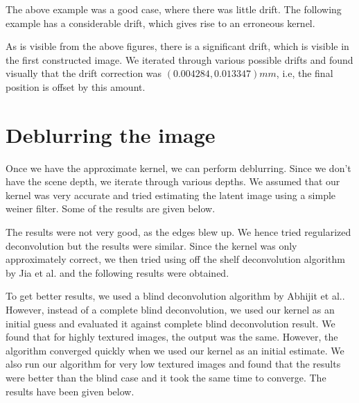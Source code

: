 \documentclass[BTech]{iitmdiss}
\begin{document}
The above example was a good case, where there was little drift. The 
following example has a considerable drift, which gives rise to an 
erroneous kernel.

As is visible from the above figures, there is a significant drift, which
is visible in the first constructed image. We iterated through various
possible drifts and found visually that the drift correction was
$(0.004284, 0.013347)mm$, i.e, the final position is offset by this 
amount. 

\section{Deblurring the image}
\label{deblurring:deblurring}
Once we have the approximate kernel, we can perform deblurring. Since we
don't have the scene depth, we iterate through various depths. We assumed
that our kernel was very accurate and tried estimating the latent image
using a simple weiner filter. Some of the results are given below.

The results were not very good, as the edges blew up. We hence tried 
regularized deconvolution but the results were similar. Since the kernel
was only approximately correct, we then tried using off the shelf 
deconvolution algorithm by Jia et al. and the following results were
obtained.

To get better results, we used a blind deconvolution algorithm by Abhijit
et al.. However, instead of a complete blind deconvolution, we used our
kernel as an initial guess and evaluated it against complete blind 
deconvolution result. We found that for highly textured images, the 
output was the same. However, the algorithm converged quickly when we 
used our kernel as an initial estimate. We also run our algorithm for 
very low textured images and found that the results were better than the 
blind case and it took the same time to converge. The results have been
given below.
\end{document}
